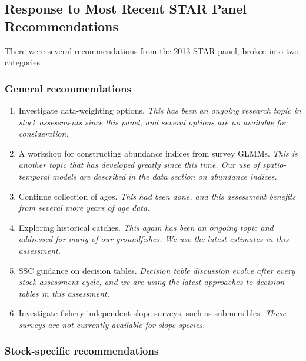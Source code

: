 \documentclass[
]{scrartcl}
\providecommand{\tightlist}{%
  \setlength{\itemsep}{0pt}\setlength{\parskip}{0pt}}\usepackage{longtable,booktabs,array}
\begin{document}
\subsection{Response to Most Recent STAR Panel
Recommendations}\label{response-to-most-recent-star-panel-recommendations}

There were several recommendations from the 2013 STAR panel, broken into
two categories

\subsubsection{General recommendations}\label{general-recommendations}

\begin{enumerate}
\def\labelenumi{\arabic{enumi}.}
\tightlist
\item
  Investigate data-weighting options. \emph{This has been an ongoing
  research topic in stock assessments since this panel, and several
  options are no available for consideration.}
\item
  A workshop for constructing abundance indices from survey GLMMs.
  \emph{This is another topic that has developed greatly since this
  time. Our use of spatio-temporal models are described in the data
  section on abundance indices.}
\item
  Continue collection of ages. \emph{This had been done, and this
  assessment benefits from several more years of age data.}
\item
  Exploring historical catches. \emph{This again has been an ongoing
  topic and addressed for many of our groundfishes. We use the latest
  estimates in this assessment.}
\item
  SSC guidance on decision tables. \emph{Decision table discussion
  evolve after every stock assessment cycle, and we are using the latest
  approaches to decision tables in this assessment.}
\item
  Investigate fishery-independent slope surveys, such as submersibles.
  \emph{These surveys are not currently available for slope species.}
\end{enumerate}

\subsubsection{Stock-specific
recommendations}\label{stock-specific-recommendations}
\end{document}
